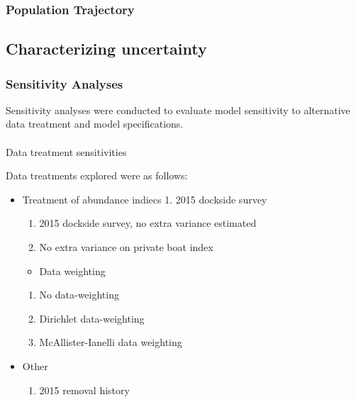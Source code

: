 \documentclass[
]{scrartcl}
\makeatletter
\let\oldparagraph\paragraph
\renewcommand{\paragraph}{
    \@ifstar
      \xxxParagraphStar
      \xxxParagraphNoStar
  }
\newcommand{\xxxParagraphStar}[1]{\oldparagraph*{#1}\mbox{}}
\newcommand{\xxxParagraphNoStar}[1]{\oldparagraph{#1}\mbox{}}
\providecommand{\tightlist}{%
  \setlength{\itemsep}{0pt}\setlength{\parskip}{0pt}}\usepackage{longtable,booktabs,array}
\makeatother
\begin{document}
\subsubsection{Population Trajectory}\label{population-trajectory}

\newpage{}

\subsection{Characterizing
uncertainty}\label{characterizing-uncertainty}

\subsubsection{Sensitivity Analyses}\label{sec-assmt-sens}

Sensitivity analyses were conducted to evaluate model sensitivity to
alternative data treatment and model specifications.

\paragraph{Data treatment
sensitivities}\label{data-treatment-sensitivities}

Data treatments explored were as follows:

\begin{itemize}
\tightlist
\item
  Treatment of abundance indiecs 1. 2015 dockside survey

  \begin{enumerate}
  \def\labelenumi{\arabic{enumi}.}
  \setcounter{enumi}{1}
  \tightlist
  \item
    2015 dockside survey, no extra variance estimated
  \item
    No extra variance on private boat index
  \end{enumerate}

  \begin{itemize}
  \tightlist
  \item
    Data weighting
  \end{itemize}

  \begin{enumerate}
  \def\labelenumi{\arabic{enumi}.}
  \setcounter{enumi}{10}
  \tightlist
  \item
    No data-weighting
  \item
    Dirichlet data-weighting
  \item
    McAllister-Ianelli data weighting
  \end{enumerate}
\item
  Other

  \begin{enumerate}
  \def\labelenumi{\arabic{enumi}.}
  \setcounter{enumi}{13}
  \tightlist
  \item
    2015 removal history
  \end{enumerate}
\end{itemize}
\end{document}
